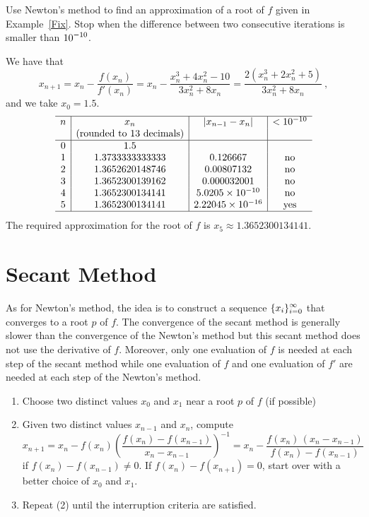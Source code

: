 \begin{egg}
Use Newton's method to find an approximation of
a root of $f$ given in Example~\ref{Fix}.  Stop when the difference
between two consecutive iterations is smaller than $\displaystyle 10^{-10}$.

We have that
\[
x_{n+1} = x_n - \frac{f(x_n)}{f'(x_n)}
= x_n - \frac{x_n^3 + 4 x_n^2 - 10}{3 x_n^2 + 8 x_n}
= \frac{2 \left( x_n^3 + 2 x_n^2 + 5\right)}{3 x_n^2 + 8 x_n} \ ,
\]
and we take $x_0 = 1.5$.
\[
\begin{array}{c|c|c|c}
\hline
n & x_n & |x_{n-1}-x_n| & < 10^{-10}\\
& \text{(rounded to 13 decimals)} & & \\
\hline
0 & 1.5 & & \\
1 & 1.3733333333333 & 0.126667 & \text{no} \\
2 & 1.3652620148746 & 0.00807132 & \text{no} \\
3 & 1.3652300139162 & 0.000032001 & \text{no} \\
4 & 1.3652300134141 & 5.0205\times 10^{-10} & \text{no} \\
5 & 1.3652300134141 & 2.22045\times 10^{-16} & \text{yes} \\
\hline
\end{array}
\]
The required approximation for the root of $f$ is
$x_5 \approx 1.3652300134141$.
\end{egg}

\section{Secant Method}

As for Newton's method, the idea is to construct a
sequence $\displaystyle \{x_i\}_{i=0}^\infty$ that converges to a root $p$ of
$f$.  The convergence of the secant method is generally slower than
the convergence of the Newton's method but this secant method does not
use the derivative of $f$.  Moreover, only one evaluation of $f$ is
needed at each step of the secant method while one evaluation of $f$
and one evaluation of $f'$ are needed at each step of the Newton's method.

\begin{algo}[Secant]
\begin{enumerate}
\item Choose two distinct values $x_0$ and $x_1$ near a root $p$ of
  $f$ (if possible)
\item Given two distinct values $x_{n-1}$ and $x_n$, compute
\begin{equation} \label{formula3}
x_{n+1} = x_n - f(x_n) \left(\frac{f(x_n)-f(x_{n-1})}{x_n-x_{n-1}}\right)^{-1}
= x_n - \frac{f(x_n)\,(x_n-x_{n-1})}{f(x_n)-f(x_{n-1})}
\end{equation}
if $f(x_n)-f(x_{n-1})\not=0$.  If $f(x_n)-f(x_{n+1})=0$, start over
with a better choice of $x_0$ and $x_1$.
\item Repeat (2) until the interruption criteria are satisfied.
\end{enumerate}
\end{algo}

